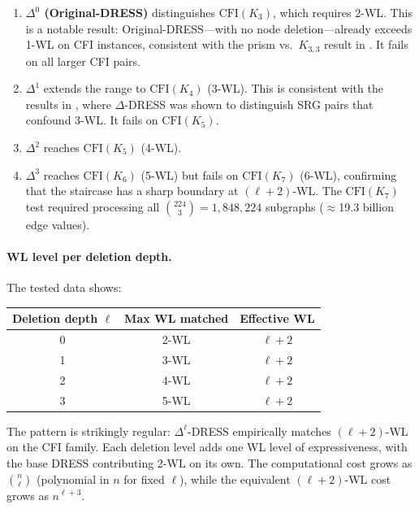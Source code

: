 \documentclass[11pt,a4paper]{article}
\begin{document}
\begin{enumerate}
    \item \textbf{$\Delta^0$ (Original-DRESS)} distinguishes $\text{CFI}(K_3)$, which requires 2-WL. This is a notable result: Original-DRESS---with no node deletion---already exceeds 1-WL on CFI instances, consistent with the prism vs.\ $K_{3,3}$ result in \cite{castrillo2026dress}. It fails on all larger CFI pairs.

    \item \textbf{$\Delta^1$} extends the range to $\text{CFI}(K_4)$ (3-WL). This is consistent with the results in \cite{castrillo2026dress}, where $\Delta$-DRESS was shown to distinguish SRG pairs that confound 3-WL. It fails on $\text{CFI}(K_5)$.

    \item \textbf{$\Delta^2$} reaches $\text{CFI}(K_5)$ (4-WL).

    \item \textbf{$\Delta^3$} reaches $\text{CFI}(K_6)$ (5-WL) but fails on $\text{CFI}(K_7)$ (6-WL), confirming that the staircase has a sharp boundary at $(\ell+2)$-WL. The $\text{CFI}(K_7)$ test required processing all $\binom{224}{3} = 1{,}848{,}224$ subgraphs ($\approx$19.3 billion edge values).
\end{enumerate}

\paragraph{WL level per deletion depth.} The tested data shows:

\begin{center}
\begin{tabular}{@{}ccc@{}}
\toprule
Deletion depth $\ell$ & Max WL matched & Effective WL \\
\midrule
0 & 2-WL & $\ell + 2$ \\
1 & 3-WL & $\ell + 2$ \\
2 & 4-WL & $\ell + 2$ \\
3 & 5-WL & $\ell + 2$ \\
\bottomrule
\end{tabular}
\end{center}

The pattern is strikingly regular: $\Delta^\ell$-DRESS empirically matches $(\ell+2)$-WL on the CFI family. Each deletion level adds one WL level of expressiveness, with the base DRESS contributing 2-WL on its own. The computational cost grows as $\binom{n}{\ell}$ (polynomial in $n$ for fixed $\ell$), while the equivalent $(\ell+2)$-WL cost grows as $n^{\ell+3}$.
\end{document}
